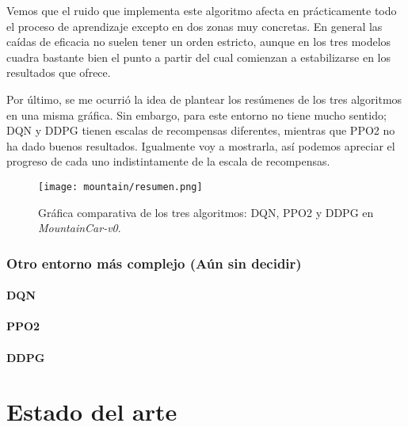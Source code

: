 \documentclass[11pt,fleqn]{book} %
\begin{document}
Vemos que el ruido que implementa este algoritmo afecta en prácticamente todo el proceso de aprendizaje excepto en dos zonas muy concretas. En general las caídas de eficacia no suelen tener un orden estricto, aunque en los tres modelos cuadra bastante bien el punto a partir del cual comienzan a estabilizarse en los resultados que ofrece.

Por último, se me ocurrió la idea de plantear los resúmenes de los tres algoritmos en una misma gráfica. Sin embargo, para este entorno no tiene mucho sentido; DQN y DDPG tienen escalas de recompensas diferentes, mientras que PPO2 no ha dado buenos resultados. Igualmente voy a mostrarla, así podemos apreciar el progreso de cada uno indistintamente de la escala de recompensas.

\begin{figure}[H]
	\centering\texttt{[image: mountain/resumen.png]}
	\caption{Gráfica comparativa de los tres algoritmos: DQN, PPO2 y DDPG en  \textit{MountainCar-v0}.}
	\label{fig:mountain20} %
\end{figure}



\section{Otro entorno más complejo (Aún sin decidir)}

\subsection{DQN}

\subsection{PPO2}

\subsection{DDPG}


\part{Estado del arte}
\end{document}
